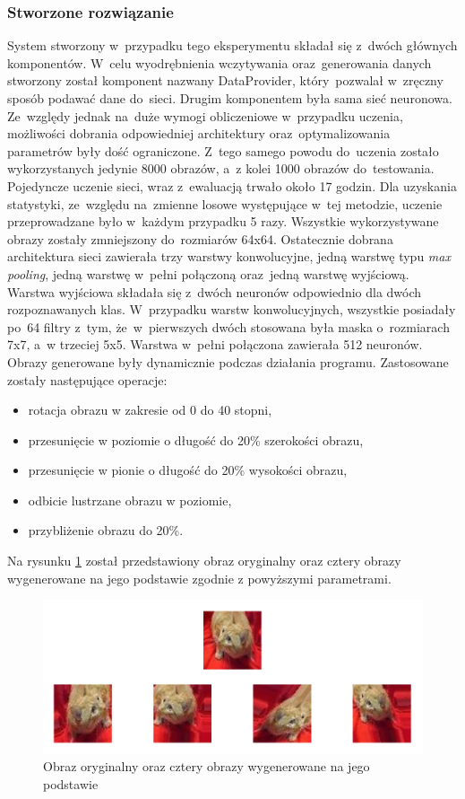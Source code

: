 \subsubsection{Stworzone rozwiązanie}
System stworzony w~przypadku tego eksperymentu składał się z~dwóch głównych komponentów. W~celu wyodrębnienia wczytywania oraz~generowania danych stworzony został komponent nazwany DataProvider, który~pozwalał w~zręczny sposób podawać dane do~sieci. Drugim komponentem była sama sieć neuronowa. Ze~względy jednak na~duże wymogi obliczeniowe w~przypadku uczenia, możliwości dobrania odpowiedniej architektury oraz~optymalizowania parametrów były dość ograniczone. Z~tego samego powodu do~uczenia zostało wykorzystanych jedynie 8000 obrazów, a~z kolei 1000 obrazów do~testowania. Pojedyncze uczenie sieci, wraz z~ewaluacją trwało około 17 godzin. Dla uzyskania statystyki, ze~względu na~zmienne losowe występujące w~tej metodzie, uczenie przeprowadzane było w~każdym przypadku 5 razy. Wszystkie wykorzystywane obrazy zostały zmniejszony do~rozmiarów 64x64. Ostatecznie dobrana architektura sieci zawierała trzy warstwy konwolucyjne, jedną warstwę typu \textit{max pooling}, jedną warstwę w~pełni połączoną  oraz~jedną warstwę wyjściową. Warstwa wyjściowa składała się z~dwóch neuronów odpowiednio dla dwóch rozpoznawanych klas. W~przypadku warstw konwolucyjnych, wszystkie posiadały po~64 filtry z~tym, że~w~pierwszych dwóch stosowana była maska o~rozmiarach 7x7, a~w trzeciej 5x5.  Warstwa w~pełni połączona zawierała 512 neuronów. Obrazy generowane były dynamicznie podczas działania programu. Zastosowane zostały następujące operacje:
\begin{itemize}
\item rotacja obrazu w zakresie od 0 do 40 stopni,
\item przesunięcie w poziomie o długość do 20\% szerokości obrazu,
\item przesunięcie w pionie o długość do 20\% wysokości obrazu,
\item odbicie lustrzane obrazu w poziomie,
\item przybliżenie obrazu do 20\%.
\end{itemize}
Na rysunku \ref{catdogsimages} został przedstawiony obraz oryginalny oraz cztery obrazy wygenerowane na jego podstawie zgodnie z powyższymi parametrami.

\begin{figure}[ht!]
\centering
\includegraphics[scale=0.4]{res/catdogsaug.png}
\caption[Caption for LOF]{Obraz oryginalny oraz cztery obrazy wygenerowane na jego podstawie \label{catdogsimages}}
\end{figure} 

